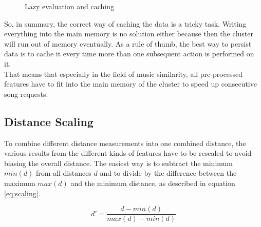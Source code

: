 \begin{figure}[htbp]
	\centering
	\caption{Lazy evaluation and caching}
	\label{lazcach}
\end{figure}
\FloatBarrier

\noindent So, in summary, the correct way of caching the data is a tricky task. Writing everything into the main memory is no solution either because then the cluster will run out of memory eventually. As a rule of thumb, the best way to persist data is to cache it every time more than one subsequent action is performed on it.\\
That means that especially in the field of music similarity, all pre-processed features have to fit into the main memory of the cluster to speed up consecutive song requests. 

\subsection{Distance Scaling}\label{distsc}

To combine different distance measurements into one combined distance, the various results from the different kinds of features have to be rescaled to avoid biasing the overall distance.
The easiest way is to subtract the minimum $min(d)$ from all distances $d$ and to divide by the difference between the maximum $max(d)$ and the minimum distance, as described in equation \ref{eq:scaling}. 

\begin{equation} \label{eq:scaling}
d' = \frac{d - min(d)}{max(d) - min(d)}
\end{equation}

